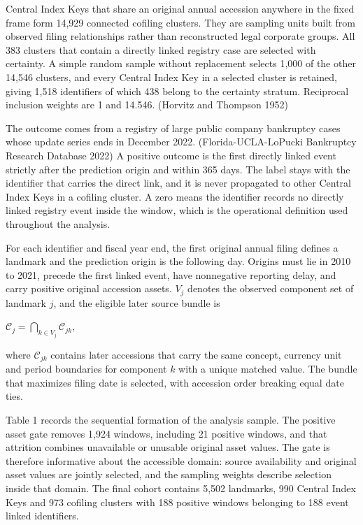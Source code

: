 \documentclass[10pt,a4paper,twocolumn]{article}
\begin{document}
Central Index Keys that share an original annual accession anywhere in the fixed frame form 14,929 connected cofiling clusters. They are sampling units built from observed filing relationships rather than reconstructed legal corporate groups. All 383 clusters that contain a directly linked registry case are selected with certainty. A simple random sample without replacement selects 1,000 of the other 14,546 clusters, and every Central Index Key in a selected cluster is retained, giving 1,518 identifiers of which 438 belong to the certainty stratum. Reciprocal inclusion weights are 1 and 14.546. (Horvitz and Thompson 1952)

The outcome comes from a registry of large public company bankruptcy cases whose update series ends in December 2022. (Florida-UCLA-LoPucki Bankruptcy Research Database 2022) A positive outcome is the first directly linked event strictly after the prediction origin and within 365 days. The label stays with the identifier that carries the direct link, and it is never propagated to other Central Index Keys in a cofiling cluster. A zero means the identifier records no directly linked registry event inside the window, which is the operational definition used throughout the analysis.

For each identifier and fiscal year end, the first original annual filing defines a landmark and the prediction origin is the following day. Origins must lie in 2010 to 2021, precede the first linked event, have nonnegative reporting delay, and carry positive original accession assets. $V_j$ denotes the observed component set of landmark $j$, and the eligible later source bundle is

$\mathcal{C}_j=\bigcap_{k\in V_j}\mathcal{C}_{jk},$

where $\mathcal{C}_{jk}$ contains later accessions that carry the same concept, currency unit and period boundaries for component $k$ with a unique matched value. The bundle that maximizes filing date is selected, with accession order breaking equal date ties.

Table 1 records the sequential formation of the analysis sample. The positive asset gate removes 1,924 windows, including 21 positive windows, and that attrition combines unavailable or unusable original asset values. The gate is therefore informative about the accessible domain: source availability and original asset values are jointly selected, and the sampling weights describe selection inside that domain. The final cohort contains 5,502 landmarks, 990 Central Index Keys and 973 cofiling clusters with 188 positive windows belonging to 188 event linked identifiers.
\end{document}
